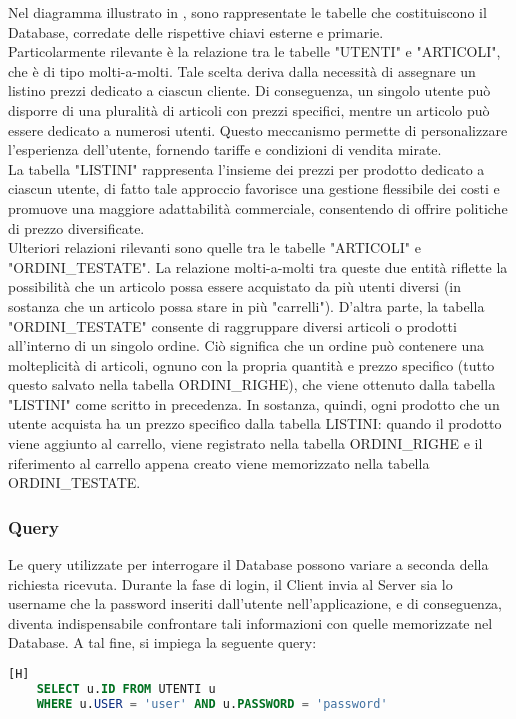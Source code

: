 Nel diagramma illustrato in , sono rappresentate le tabelle che costituiscono il Database, corredate delle rispettive chiavi esterne e primarie.\\
Particolarmente rilevante è la relazione tra le tabelle "UTENTI" e "ARTICOLI", che è di tipo molti-a-molti. Tale scelta deriva dalla necessità di assegnare un listino prezzi dedicato a ciascun cliente. Di conseguenza, un singolo utente può disporre di una pluralità di articoli con prezzi specifici, mentre un articolo può essere dedicato a numerosi utenti. Questo meccanismo permette di personalizzare l'esperienza dell'utente, fornendo tariffe e condizioni di vendita mirate.\\
La tabella "LISTINI" rappresenta l'insieme dei prezzi per prodotto dedicato a ciascun utente, di fatto tale approccio favorisce una gestione flessibile dei costi e promuove una maggiore adattabilità commerciale, consentendo di offrire politiche di prezzo diversificate.\\
Ulteriori relazioni rilevanti sono quelle tra le tabelle "ARTICOLI" e "ORDINI\_TESTATE". La relazione molti-a-molti tra queste due entità riflette la possibilità che un articolo possa essere acquistato da più utenti diversi (in sostanza che un articolo possa stare in più "carrelli"). D'altra parte, la tabella "ORDINI\_TESTATE" consente di raggruppare diversi articoli o prodotti all'interno di un singolo ordine. Ciò significa che un ordine può contenere una molteplicità di articoli, ognuno con la propria quantità e prezzo specifico (tutto questo salvato nella tabella ORDINI\_RIGHE), che viene ottenuto dalla tabella "LISTINI" come scritto in precedenza. In sostanza, quindi, ogni prodotto che un utente acquista ha un prezzo specifico dalla tabella LISTINI: quando il prodotto viene aggiunto al carrello, viene registrato nella tabella ORDINI\_RIGHE e il riferimento al carrello appena creato viene memorizzato nella tabella ORDINI\_TESTATE.

\subsubsection{Query}
Le query utilizzate per interrogare il Database possono variare a seconda della richiesta ricevuta. Durante la fase di login, il Client invia al Server sia lo username che la password inseriti dall'utente nell'applicazione, e di conseguenza, diventa indispensabile confrontare tali informazioni con quelle memorizzate nel Database. A tal fine, si impiega la seguente query:
\begin{lstlisting}[language=sql] [H]
	SELECT u.ID FROM UTENTI u 
	WHERE u.USER = 'user' AND u.PASSWORD = 'password'
\end{lstlisting}

